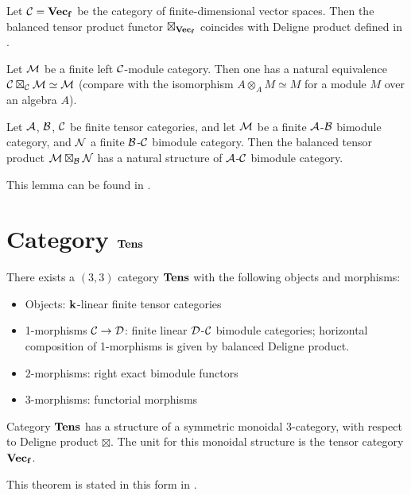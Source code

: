 \begin{example}\label{x:vecf-modules}
  Let $\mathcal{C}=\mathbf{Vec_f}$ be the category of finite-dimensional vector spaces.
  Then the balanced tensor product functor $\boxtimes_{\mathbf{Vec_f}}$ coincides with
  Deligne product defined in .
\end{example}

\begin{example}\label{x:module-dual-category}
  Let $\mathcal{M}$ be a finite left $\mathcal{C}$-module category. Then one has a natural
  equivalence $\mathcal{C}\boxtimes_{\mathcal{C}} \mathcal{M}\simeq \mathcal{M}$ (compare with the isomorphism
  $A\otimes_A M\simeq M$ for a module $M$ over an algebra $A$).
\end{example}

\begin{lemma}\label{l:bimodule-composition}
  Let $\mathcal{A}$, $\mathcal{B}$, $\mathcal{C}$ be finite tensor categories, and let
  $\mathcal{M}$ be a finite $\mathcal{A}$-$\mathcal{B}$ bimodule category, and $\mathcal{N}$ a finite
  $\mathcal{B}$-$\mathcal{C}$ bimodule category. Then the balanced tensor product
  $\mathcal{M}\boxtimes_{\mathcal{B}} \mathcal{N}$ has a natural structure of $\mathcal{A}$-$\mathcal{C}$
  bimodule category.
\end{lemma}
This lemma can be found in \cite[Remark 3.7]{dsps-balanced}.

\section{Category $\mathbf{Tens}$}\label{s:tens-category}

\begin{theorem}\label{t:tens-exists}
  There exists a $(3, 3)$ category $\mathbf{Tens}$ with the following objects and
  morphisms:
  \begin{itemize}
    \item Objects: $\mathbf{k}$-linear finite tensor categories
    \item 1-morphisms $\mathcal{C}\to\mathcal{D}$: finite linear $\mathcal{D}$-$\mathcal{C}$ bimodule
      categories; horizontal composition of
      1-morphisms is given by balanced Deligne product.
    \item 2-morphisms: right exact bimodule functors
    \item 3-morphisms: functorial morphisms
  \end{itemize}
  Category
  $\mathbf{Tens}$ has a structure of a symmetric monoidal 3-category, with respect
  to Deligne product $\boxtimes$. The unit for this monoidal structure is the
  tensor category $\mathbf{Vec_f}$.
\end{theorem}
This theorem is stated in this form in
\cite[Theorem 2.2.18]{dsps-dualizable}.

